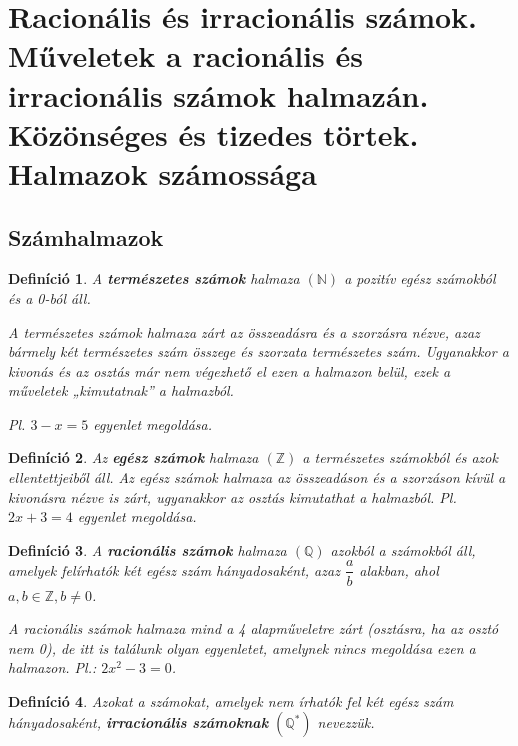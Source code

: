 \documentclass[12pt,a4paper]{article}
\newtheorem{definition}{Definíció} [section]
\begin{document}
\newpage


\section{Racionális és irracionális számok. Műveletek a racionális és irracionális számok halmazán. Közönséges és tizedes törtek. Halmazok számossága}

\subsection{Számhalmazok}

\begin{definition}
A \textbf{természetes számok} halmaza $(\mathbb{N})$ a pozitív egész számokból és a 0-ból áll.

A természetes számok halmaza zárt az összeadásra és a szorzásra nézve, azaz bármely két természetes szám összege és szorzata természetes szám. Ugyanakkor a kivonás és az osztás már nem végezhető el ezen a halmazon belül, ezek a műveletek „kimutatnak” a halmazból.

Pl. $3 - x = 5$ egyenlet megoldása.
\end{definition}

\begin{definition}
Az \textbf{egész számok} halmaza $(\mathbb{Z})$ a természetes számokból és azok ellentettjeiből áll. Az egész számok halmaza az összeadáson és a szorzáson kívül a kivonásra nézve is zárt, ugyanakkor az osztás kimutathat a halmazból. Pl. $2x + 3 = 4$ egyenlet megoldása.
\end{definition}

\begin{definition}
A \textbf{racionális számok} halmaza $(\mathbb{Q})$ azokból a számokból áll, amelyek felírhatók két egész szám hányadosaként, azaz $\dfrac{a}{b}$ alakban, ahol $a, b\in \mathbb{Z}, b \neq 0$.

A racionális számok halmaza mind a 4 alapműveletre zárt (osztásra, ha az osztó nem 0), de itt is találunk olyan egyenletet, amelynek nincs megoldása ezen a halmazon. Pl.: $2x^2 - 3 = 0$.
\end{definition}

\begin{definition}
Azokat a számokat, amelyek nem írhatók fel két egész szám hányadosaként, \textbf{irracionális számoknak} $(\mathbb{Q}^*)$ nevezzük.
\end{definition}
\end{document}
